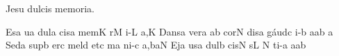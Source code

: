 
\beginhymn Jesu dulcis memoria.

\Internote
\nosolesmescustos
{}
\initiumgregorianum
{}%
\sgn {}Es\punctum a\egn
\sgn {}u{}\punctum a\egn
\spatium
\sgn d{u}l\punctum a\egn
\sgn cis\punctum a\egn
\spatium
\sgn mem\punctum K\egn
{}r\punctum M\egn
\sgn {}i-\punctum L\egn
\sgn {}a{,}\punctum K\egn
\spatium
\divisiominima
\spatium
\sgn Da{ns}\punctum a\egn
\spatium
\sgn v{e}r\punctum a\egn
\sgn {}a{}\punctum b\egn
\spatium
\sgn c{o}r\punctum N\egn
\sgn dis\punctum a\egn
\spatium
\sgn g{\'a}{ud}\punctum c\egn
\sgn {}i-\punctum b\egn
\sgn {}a{}\punctum a\augmentum b\egn
\spatium
\divisiominor
\spatium
\custos a
\lineaproxima
\sgn Sed\punctum a\egn
\spatium
\sgn sup\punctum b\egn
\sgn {}er\punctum c\egn
\spatium
\sgn mel\punctum d\egn
\spatium
\sgn {}et\punctum c\egn
\spatium
{}m\punctum a\egn
\sgn ni-\punctum c\egn
\sgn {}a{,}\climacus baN\egn
\spatium
\divisiominor
\spatium
\sgn {}Ej\punctum a\egn
\sgn {}us\punctum a\egn
\spatium
\sgn d{u}l\punctum b\egn
\sgn cis\punctum N\egn
\spatium
{}s\punctum L\egn
{}\punctum N\egn
\sgn ti-\punctum a\egn
\sgn {}a{}\punctum a\augmentum b\egn
\spatium
\Finisgregoriana

\bigskip

\beginlyrics

